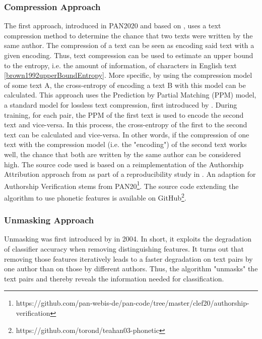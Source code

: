 \subsubsection{Compression Approach}
The first approach, introduced in PAN2020 and based on \cite{teahan2003compression}, uses a text compression method to determine the chance that two texts were written by the same author.
The compression of a text can be seen as encoding said text with a given encoding.
Thus, text compression can be used to estimate an upper bound to the entropy, i.e. the amount of information, of characters in English text \ref{brown1992upperBoundEntropy}.
More specific, by using the compression model of some text A, the cross-entropy of encoding a text B with this model can be calculated.
This approach uses the Prediction by Partial Matching (PPM) model, a standard model for lossless text compression, first introduced by \cite{cleary1984PPM}.
During training, for each pair, the PPM of the first text is used to encode the second text and vice-versa.
In this process, the cross-entropy of the first to the second text can be calculated and vice-versa.
In other words, if the compression of one text with the compression model (i.e. the "encoding") of the second text works well, the chance that both are written by the same author can be considered high.
The source code used is based on a reimplementation of the Authorship Attribution approach from \cite{teahan2003compression} as part of a reproducibility study in \cite{potthast2016reimplementation}.
An adaption for Authorship Verification stems from PAN20\footnote{https://github.com/pan-webis-de/pan-code/tree/master/clef20/authorship-verification}.
The source code extending the algorithm to use phonetic features is available on GitHub\footnote{https://github.com/torond/teahan03-phonetic}.

\subsubsection{Unmasking Approach}
Unmasking was first introduced by \cite{koppel2004unmasking} in 2004.
In short, it exploits the degradation of classifier accuracy when removing distinguishing features.
It turns out that removing those features iteratively leads to a faster degradation on text pairs by one author than on those by different authors.
Thus, the algorithm "unmasks" the text pairs and thereby reveals the information needed for classification.\\

